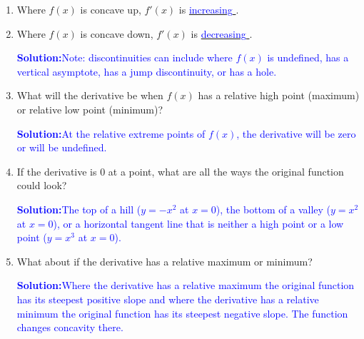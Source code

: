 \documentclass[letterpaper,11pt]{article}
\newcommand{\sol}[2]{\begin{minipage}[c][#1]{\linewidth}{\textcolor{blue}{\textbf{Solution:}}\quad \textcolor{blue}{#2}}\end{minipage}}
\newcommand{\usol}[1]{\underline{\hspace{.5 in} \textcolor{blue}{#1} \hspace{.5 in}}}
\newcommand{\sol}[2]{\begin{minipage}[c][#1]{\linewidth}{\vfill}\end{minipage}}
\newcommand{\usol}[1]{\underline{\hspace{.5 in} \textcolor{white}{#1} \hspace{.5 in}}}
\begin{document}
\begin{enumerate}
\begin{enumerate}
\item Where $f(x)$ is concave up, $f'(x)$ is \usol{increasing}.

\vspace{.2in}

\item Where $f(x)$ is concave down, $f'(x)$ is \usol{decreasing}.

\vspace{.2in}


\sol{.6in}{Note: discontinuities can include where $f(x)$ is undefined, has a vertical asymptote, has a jump discontinuity, or has a hole.}

\item What will the derivative be when $f(x)$ has a relative high point (maximum) or relative low point (minimum)?  

\sol{.8 in}{At the relative extreme points of $f(x)$, the derivative will be zero or will be undefined.}

\item If the derivative is 0 at a point, what are all the ways the original function could look? 

\sol{.9 in}{The top of a hill ($y=-x^2$ at $x=0$), the bottom of a valley ($y=x^2$ at $x=0$), or a horizontal tangent line that is
neither a high point or a low point ($y=x^3$ at $x=0$).}

\item What about if the derivative has a relative maximum or minimum?

\sol{.8 in}{Where the derivative has a relative maximum the original function has its steepest positive slope and where the derivative has a relative minimum the original function has its steepest negative slope.  The function changes concavity there.}

\end{enumerate}



\end{enumerate}
\end{document}
